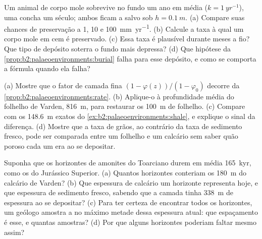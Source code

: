 \begin{exercise}[$\star\star\star$]\label{exo:b2:palaeoenvironments:10}
Um animal de corpo mole sobrevive no fundo um ano em média ($k = \qty{1}{yr^{-1}}$), uma
concha um século; ambos ficam a salvo sob $h = \qty{0.1}{m}$. (a) Compare suas chances de
preservação a 1, 10 e \qty{100}{mm.yr^{-1}}. (b) Calcule a taxa à qual um corpo mole em
cem é preservado. (c) Essa taxa é plausível durante meses a fio? Que tipo de depósito soterra
o fundo mais depressa? (d) Que hipótese da \cref{prop:b2:palaeoenvironments:burial} falha para esse
depósito, e como se comporta a fórmula quando ela falha?
\end{exercise}

\begin{exercise}[$\star\star\star$]\label{exo:b2:palaeoenvironments:11}
(a) Mostre que o fator de camada fina $(1 - \varphi(z))/(1 - \varphi_0)$ decorre da
\cref{prop:b2:palaeoenvironments:rate}. (b) Aplique-o à profundidade média do folhelho de Varden,
\qty{816}{m}, para restaurar os \qty{100}{m} de folhelho. (c) Compare com os \qty{148.6}{m} exatos do
\cref{ex:b2:palaeoenvironments:shale}, e explique o sinal da diferença. (d) Mostre que a
taxa de grãos, ao contrário da taxa de sedimento fresco, pode ser comparada entre um folhelho e um calcário
sem saber quão poroso cada um era ao se depositar.
\end{exercise}

\begin{exercise}[$\star\star\star$]\label{exo:b2:palaeoenvironments:12}
Suponha que os horizontes de amonites do Toarciano durem em média \qty{165}{kyr}, como os do Jurássico Superior.
(a) Quantos horizontes conteriam os \qty{180}{m} do calcário de Varden? (b) Que espessura de
calcário um horizonte representa hoje, e que espessura de sedimento fresco, sabendo que a
camada tinha \qty{338}{m} de espessura ao se depositar? (c) Para ter certeza de encontrar todos os horizontes, um
geólogo amostra a no máximo metade dessa espessura atual: que espaçamento é esse, e quantas
amostras? (d) Por que alguns horizontes poderiam faltar mesmo assim?
\end{exercise}

